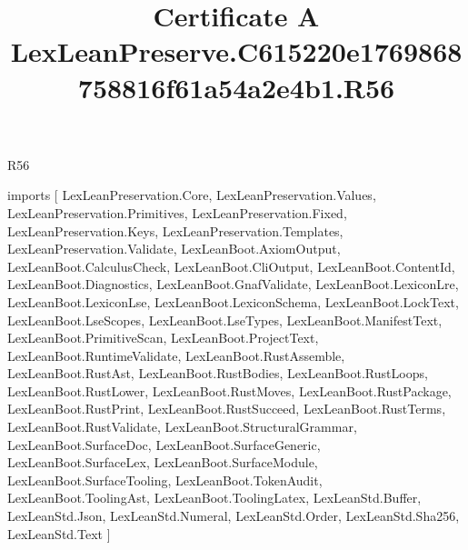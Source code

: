 \begin{lexlean}{R56}
\title{Certificate A LexLeanPreserve.C615220e1769868758816f61a54a2e4b1.R56}
\begin{coremodule}
imports [
  LexLeanPreservation.Core,
  LexLeanPreservation.Values,
  LexLeanPreservation.Primitives,
  LexLeanPreservation.Fixed,
  LexLeanPreservation.Keys,
  LexLeanPreservation.Templates,
  LexLeanPreservation.Validate,
  LexLeanBoot.AxiomOutput,
  LexLeanBoot.CalculusCheck,
  LexLeanBoot.CliOutput,
  LexLeanBoot.ContentId,
  LexLeanBoot.Diagnostics,
  LexLeanBoot.GnafValidate,
  LexLeanBoot.LexiconLre,
  LexLeanBoot.LexiconLse,
  LexLeanBoot.LexiconSchema,
  LexLeanBoot.LockText,
  LexLeanBoot.LseScopes,
  LexLeanBoot.LseTypes,
  LexLeanBoot.ManifestText,
  LexLeanBoot.PrimitiveScan,
  LexLeanBoot.ProjectText,
  LexLeanBoot.RuntimeValidate,
  LexLeanBoot.RustAssemble,
  LexLeanBoot.RustAst,
  LexLeanBoot.RustBodies,
  LexLeanBoot.RustLoops,
  LexLeanBoot.RustLower,
  LexLeanBoot.RustMoves,
  LexLeanBoot.RustPackage,
  LexLeanBoot.RustPrint,
  LexLeanBoot.RustSucceed,
  LexLeanBoot.RustTerms,
  LexLeanBoot.RustValidate,
  LexLeanBoot.StructuralGrammar,
  LexLeanBoot.SurfaceDoc,
  LexLeanBoot.SurfaceGeneric,
  LexLeanBoot.SurfaceLex,
  LexLeanBoot.SurfaceModule,
  LexLeanBoot.SurfaceTooling,
  LexLeanBoot.TokenAudit,
  LexLeanBoot.ToolingAst,
  LexLeanBoot.ToolingLatex,
  LexLeanStd.Buffer,
  LexLeanStd.Json,
  LexLeanStd.Numeral,
  LexLeanStd.Order,
  LexLeanStd.Sha256,
  LexLeanStd.Text
]


\end{coremodule}
\end{lexlean}
